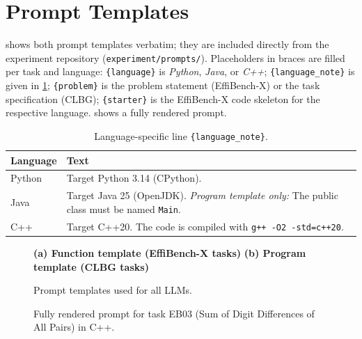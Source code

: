 \section{Prompt Templates}
\label{app:prompts}

 shows both prompt templates verbatim; they are included directly
from the experiment repository (\texttt{experiment/prompts/}). Placeholders in braces are
filled per task and language: \texttt{\{language\}} is \emph{Python}, \emph{Java}, or
\emph{C++}; \texttt{\{language\_note\}} is given in \cref{tab:language-notes};
\texttt{\{problem\}} is the problem statement (EffiBench-X) or the task specification
(CLBG); \texttt{\{starter\}} is the EffiBench-X code skeleton for the respective language.
 shows a fully rendered prompt.

\begin{table}[h]
  \centering
  \caption{Language-specific line \texttt{\{language\_note\}}.}
  \label{tab:language-notes}
  \footnotesize
  \begin{tabular}{@{}lp{}@{}}
    \toprule
    Language & Text \\
    \midrule
    Python & Target Python 3.14 (CPython). \\
    Java   & Target Java 25 (OpenJDK). \newline
             \emph{Program template only:} The public class must be named \texttt{Main}. \\
    C++    & Target C++20. The code is compiled with \texttt{g++ -O2 -std=c++20}. \\
    \bottomrule
  \end{tabular}
\end{table}

\begin{figure}[t]
  \textbf{\footnotesize (a) Function template (EffiBench-X tasks)}
  \vspace{1ex}
  \textbf{\footnotesize (b) Program template (CLBG tasks)}
  \caption{Prompt templates used for all LLMs.}
  \label{fig:prompt-templates}
\end{figure}

\begin{figure}[t]
  \caption{Fully rendered prompt for task EB03 (Sum of Digit Differences of All Pairs) in C++.}
  \label{fig:prompt-example}
\end{figure}
